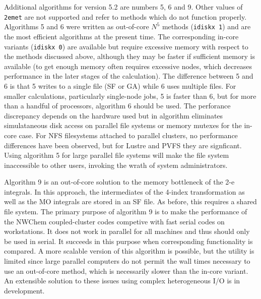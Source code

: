 Additional algorithms for version 5.2 are numbers 5, 6 and 9.  Other values of {\tt 2emet} are not 
supported and refer to methods which do not function properly.  Algorithms 5 and 6 were written as
out-of-core $N^5$ methods ({\tt idiskx 1}) and are the most efficient algorithms at the present time.
The corresponding in-core variants ({\tt idiskx 0}) are available but require excessive memory
with respect to the methods discussed above, although they may be faster if sufficient memory
is available (to get enough memory often requires excessive nodes, which decreases performance
in the later stages of the calculation).  The difference between 5 and 6 is that 5 writes
to a single file (SF or GA) while 6 uses multiple files.  For smaller calculations,
particularly single-node jobs, 5 is faster than 6, but for more than a handful of processors,
algorithm 6 should be used.  The perforance discrepancy depends on the hardware used but 
in algorithm eliminates simulataneous disk access on parallel file systems or memory mutexes for
the in-core case.  For NFS filesystems attached to parallel clusters, no performance differences
have been observed, but for Lustre and PVFS they are signficant.  Using algorithm 5 for large parallel
file systems will make the file system inaccessible to other users, invoking the wrath of 
system administrators.

Algorithm 9 is an out-of-core solution to the memory bottleneck of the 2-e integrals.  In this approach,
the intermediates of the 4-index transformation as well as the MO integrals are stored in an SF file.
As before, this requires a shared file system.  The primary purpose of algorithm 9 is to make the
performance of the NWChem coupled-cluster codes competive with fast serial codes on workstations.
It does not work in parallel for all machines and thus should only be used in serial.
It succeeds in this purpose when corresponding functionality is compared.  A more scalable version of
this algorithm is possible, but the utility is limited since large parallel computers do not
permit the wall times necessary to use an out-of-core method, which is necessarily slower than the
in-core variant.  An extensible solution to these issues using complex heterogeneous I/O is in development.

